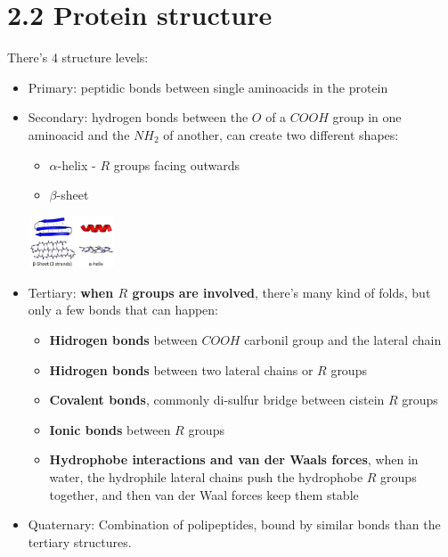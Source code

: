 \documentclass[a4paper,landscape,10pt]{cheatsheet}
\begin{document}
\section*{2.2 Protein structure}
There's 4 structure levels:
\begin{itemize}
  \item Primary: peptidic bonds between single aminoacids in the protein
  \item Secondary: hydrogen bonds between the $O$ of a $COOH$ group in one aminoacid and the $NH_2$ of another, can create two different shapes:
        \begin{itemize}
          \item $\alpha$-helix - $R$ groups facing outwards
          \item $\beta$-sheet
        \end{itemize}
        \includegraphics[width=0.2\textwidth]{images/secondary_protein_structure.png}
  \item Tertiary: \textbf{when $R$ groups are involved}, there's many kind of folds, but only a few bonds that can happen:
        \begin{itemize}
          \item \textbf{Hidrogen bonds} between $COOH$ carbonil group and the lateral chain
          \item \textbf{Hidrogen bonds} between two lateral chains or $R$ groups
          \item \textbf{Covalent bonds}, commonly di-sulfur bridge between cistein $R$ groups
          \item \textbf{Ionic bonds} between $R$ groups
          \item \textbf{Hydrophobe interactions and van der Waals forces}, when in water, the hydrophile lateral chains push
                the hydrophobe $R$ groups together, and then van der Waal forces keep them stable
        \end{itemize}
  \item Quaternary: Combination of polipeptides, bound by similar bonds than the tertiary structures.
\end{itemize}
\end{document}
